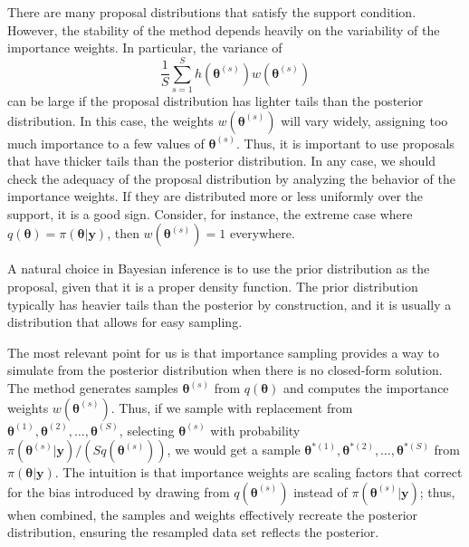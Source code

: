 There are many proposal distributions that satisfy the support condition. However, the stability of the method depends heavily on the variability of the importance weights. In particular, the variance of  
\[
\frac{1}{S}\sum_{s=1}^S h(\bm{\theta}^{(s)})w(\bm{\theta}^{(s)})
\]  
can be large if the proposal distribution has lighter tails than the posterior distribution. In this case, the weights \( w(\bm{\theta}^{(s)}) \) will vary widely, assigning too much importance to a few values of \( \bm{\theta}^{(s)} \). Thus, it is important to use proposals that have thicker tails than the posterior distribution. In any case, we should check the adequacy of the proposal distribution by analyzing the behavior of the importance weights. If they are distributed more or less uniformly over the support, it is a good sign. Consider, for instance, the extreme case where $q(\bm{\theta}) = \pi(\bm{\theta}|\bm{y})$, then $w(\bm{\theta}^{(s)}) = 1$ everywhere. 

A natural choice in Bayesian inference is to use the prior distribution as the proposal, given that it is a proper density function. The prior distribution typically has heavier tails than the posterior by construction, and it is usually a distribution that allows for easy sampling.

The most relevant point for us is that importance sampling provides a way to simulate from the posterior distribution when there is no closed-form solution. The method generates samples $\bm{\theta}^{(s)}$ from $q(\bm{\theta})$ and computes the importance weights $w(\bm{\theta}^{(s)})$. Thus, if we sample with replacement from $\bm{\theta}^{(1)},\bm{\theta}^{(2)},\dots,\bm{\theta}^{(S)}$, selecting $\bm{\theta}^{(s)}$ with probability $\pi(\bm{\theta}^{(s)}|\bm{y})/(Sq(\bm{\theta}^{(s)}))$, we would get a sample $\bm{\theta}^{*(1)},\bm{\theta}^{*(2)},\dots,\bm{\theta}^{*(S)}$ from $\pi(\bm{\theta}|\bm{y})$. The intuition is that importance weights are scaling factors that correct for the bias introduced by drawing from $q(\bm{\theta}^{(s)})$ instead of $\pi(\bm{\theta}^{(s)}|\bm{y})$; thus, when combined, the samples and weights effectively recreate the posterior distribution, ensuring the resampled data set reflects the posterior.  

